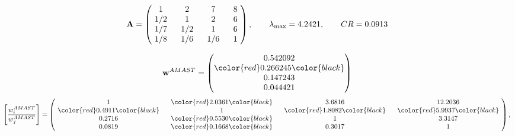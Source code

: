 \begin{example}
\begin{equation*}
\mathbf{A} =
\begin{pmatrix}
$\,\,$ 1 $\,\,$ & $\,\,$2$\,\,$ & $\,\,$7$\,\,$ & $\,\,$8 $\,\,$ \\
$\,\,$ 1/2$\,\,$ & $\,\,$ 1 $\,\,$ & $\,\,$2$\,\,$ & $\,\,$6 $\,\,$ \\
$\,\,$ 1/7$\,\,$ & $\,\,$ 1/2$\,\,$ & $\,\,$ 1 $\,\,$ & $\,\,$6 $\,\,$ \\
$\,\,$ 1/8$\,\,$ & $\,\,$ 1/6$\,\,$ & $\,\,$ 1/6$\,\,$ & $\,\,$ 1  $\,\,$ \\
\end{pmatrix},
\qquad
\lambda_{\max} =
4.2421,
\qquad
CR = 0.0913
\end{equation*}

\begin{equation*}
\mathbf{w}^{AMAST} =
\begin{pmatrix}
0.542092\\
\color{red} 0.266245\color{black} \\
0.147243\\
0.044421
\end{pmatrix}\end{equation*}
\begin{equation*}
\left[ \frac{{w}^{AMAST}_i}{{w}^{AMAST}_j} \right] =
\begin{pmatrix}
$\,\,$ 1 $\,\,$ & $\,\,$\color{red} 2.0361\color{black} $\,\,$ & $\,\,$3.6816$\,\,$ & $\,\,$12.2036$\,\,$ \\
$\,\,$\color{red} 0.4911\color{black} $\,\,$ & $\,\,$ 1 $\,\,$ & $\,\,$\color{red} 1.8082\color{black} $\,\,$ & $\,\,$\color{red} 5.9937\color{black}   $\,\,$ \\
$\,\,$0.2716$\,\,$ & $\,\,$\color{red} 0.5530\color{black} $\,\,$ & $\,\,$ 1 $\,\,$ & $\,\,$3.3147 $\,\,$ \\
$\,\,$0.0819$\,\,$ & $\,\,$\color{red} 0.1668\color{black} $\,\,$ & $\,\,$0.3017$\,\,$ & $\,\,$ 1  $\,\,$ \\
\end{pmatrix},
\end{equation*}


\end{example}
